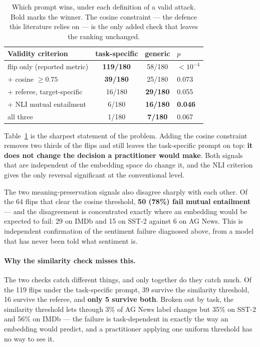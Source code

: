 \documentclass[11pt]{article}
\begin{document}
\begin{table}[t]
\centering
\small
\begin{tabular}{lccl}
\toprule
Validity criterion & task-specific & generic & $p$ \\
\midrule
flip only (reported metric) & \textbf{119/180} & 58/180 & $<10^{-4}$ \\
\; + cosine $\geq 0.75$     & \textbf{39/180}  & 25/180 & 0.073 \\
\; + referee, target-specific & 16/180 & \textbf{29/180} & 0.055 \\
\; + NLI mutual entailment    &  6/180 & \textbf{16/180} & \textbf{0.046} \\
\; all three                  &  1/180 &  \textbf{7/180} & 0.067 \\
\bottomrule
\end{tabular}
\caption{Which prompt wins, under each definition of a valid attack. Bold marks
the winner. The cosine constraint --- the defence this literature relies on ---
is the only added check that leaves the ranking unchanged.}
\label{tab:criteria}
\end{table}

Table~\ref{tab:criteria} is the sharpest statement of the problem. Adding the
cosine constraint removes two thirds of the flips and still leaves the
task-specific prompt on top: \textbf{it does not change the decision a
practitioner would make}. Both signals that are independent of the embedding
space do change it, and the NLI criterion gives the only reversal significant at
the conventional level.

The two meaning-preservation signals also disagree sharply with each other. Of
the 64 flips that clear the cosine threshold, \textbf{50 (78\%) fail mutual
entailment} --- and the disagreement is concentrated exactly where an embedding
would be expected to fail: 29 on IMDb and 15 on SST-2 against 6 on AG News. This
is independent confirmation of the sentiment failure diagnosed above, from a
model that has never been told what sentiment is.

\paragraph{Why the similarity check misses this.}
The two checks catch different things, and only together do they catch much. Of
the 119 flips under the task-specific prompt, 39 survive the similarity threshold,
16 survive the referee, and \textbf{only 5 survive both}. Broken out by task, the
similarity threshold lets through 3\% of AG News label changes but 35\% on SST-2
and 56\% on IMDb --- the failure is task-dependent in exactly the way an embedding
would predict, and a practitioner applying one uniform threshold has no way to see
it.
\end{document}
